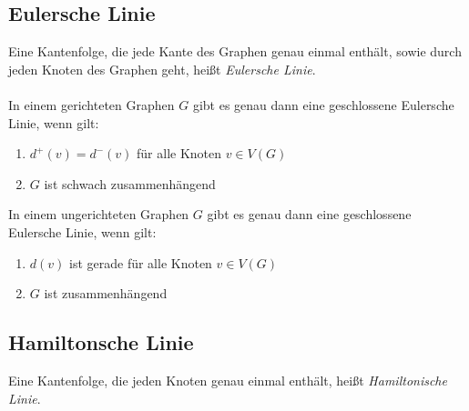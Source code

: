 \subsection{Eulersche Linie}
\label{sub:eulersche_linie}

Eine Kantenfolge, die jede Kante des Graphen genau einmal enthält, sowie durch jeden
Knoten des Graphen geht, heißt \emph{Eulersche Linie}.
\\\\
In einem gerichteten Graphen $G$ gibt es genau dann eine geschlossene Eulersche Linie, 
wenn gilt: 
\begin{enumerate}
	\item $d^+(v) = d^-(v)$ für alle Knoten $v \in V(G)$
	\item $G$ ist schwach zusammenhängend
\end{enumerate}

In einem ungerichteten Graphen $G$ gibt es genau dann eine geschlossene Eulersche Linie, 
wenn gilt:
\begin{enumerate}
	\item $d(v)$ ist gerade für alle Knoten $v \in V(G)$
	\item $G$ ist zusammenhängend
\end{enumerate} 

\subsection{Hamiltonsche Linie}
\label{sub:hamiltonsche_linie}

Eine Kantenfolge, die jeden Knoten genau einmal enthält, heißt \emph{Hamiltonische Linie}.
